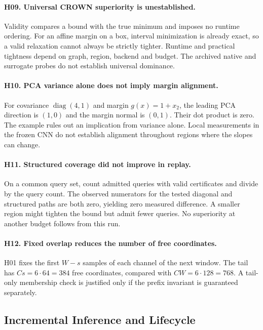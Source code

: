 \paragraph{H09. Universal CROWN superiority is unestablished.}
Validity compares a bound with the true minimum and imposes no runtime ordering. For an affine margin on a box, interval minimization is already exact, so a valid relaxation cannot always be strictly tighter. Runtime and practical tightness depend on graph, region, backend and budget. The archived native and surrogate probes do not establish universal dominance.

\paragraph{H10. PCA variance alone does not imply margin alignment.}
For covariance $\operatorname{diag}(4,1)$ and margin $g(x)=1+x_2$, the leading PCA direction is $(1,0)$ and the margin normal is $(0,1)$. Their dot product is zero. The example rules out an implication from variance alone. Local measurements in the frozen CNN do not establish alignment throughout regions where the slopes can change.

\paragraph{H11. Structured coverage did not improve in replay.}
On a common query set, count admitted queries with valid certificates and divide by the query count. The observed numerators for the tested diagonal and structured paths are both zero, yielding zero measured difference. A smaller region might tighten the bound but admit fewer queries. No superiority at another budget follows from this run.

\paragraph{H12. Fixed overlap reduces the number of free coordinates.}
H01 fixes the first $W-s$ samples of each channel of the next window. The tail has $Cs=6\cdot64=384$ free coordinates, compared with $CW=6\cdot128=768$. A tail-only membership check is justified only if the prefix invariant is guaranteed separately.

\subsection{Incremental Inference and Lifecycle}
